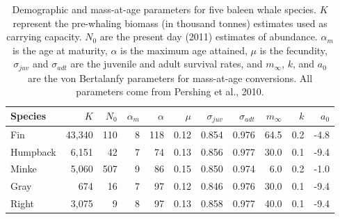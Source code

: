 \begin{table}

\caption{\label{tab:species_params}Demographic and mass-at-age parameters for five baleen whale species. $K$ represent the pre-whaling biomass (in thousand tonnes) estimates used as carrying capacity. $N_0$ are the present day (2011) estimates of abundance. $\alpha_m$ is the age at maturity, $\alpha$ is the maximum age attained, $\mu$ is the fecundity, $\sigma_{juv}$ and $\sigma_{adt}$ are the juvenile and adult survival rates, and $m_\infty$, $k$, and $a_0$ are the von Bertalanfy parameters for mass-at-age conversions. All parameters come from Pershing et al., 2010.}
\centering
\begin{tabular}[t]{lrrrrrrrrrr}
\toprule
Species & $K$ & $N_0$ & $\alpha_m$ & $\alpha$ & $\mu$ & $\sigma_{juv}$ & $\sigma_{adt}$ & $m_\infty$ & $k$ & $a_0$\\
\midrule
Fin & 43,340 & 110 & 8 & 118 & 0.12 & 0.854 & 0.976 & 64.5 & 0.2 & -4.8\\
Humpback & 6,151 & 42 & 7 & 74 & 0.13 & 0.856 & 0.977 & 30.0 & 0.1 & -9.4\\
Minke & 5,060 & 507 & 9 & 86 & 0.15 & 0.850 & 0.974 & 6.0 & 0.2 & -1.0\\
Gray & 674 & 16 & 7 & 97 & 0.12 & 0.846 & 0.976 & 30.0 & 0.1 & -9.4\\
Right & 3,075 & 9 & 8 & 97 & 0.13 & 0.858 & 0.977 & 40.0 & 0.1 & -9.4\\
\bottomrule
\end{tabular}
\end{table}